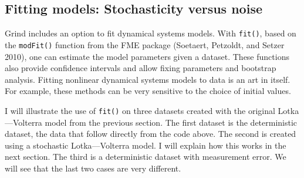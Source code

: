 \documentclass[
  a4paper,
  DIV=11,
  numbers=noendperiod,
  oneside]{scrreprt}
\begin{document}
\subsection{Fitting models: Stochasticity versus
noise}\label{sec-Fitting-models-stochasticity-versus-noise}

Grind includes an option to fit dynamical systems models. With
\texttt{fit()}, based on the \texttt{modFit()} function from the FME
package (Soetaert, Petzoldt, and Setzer 2010), one can estimate the
model parameters given a dataset. These functions also provide
confidence intervals and allow fixing parameters and bootstrap analysis.
Fitting nonlinear dynamical systems models to data is an art in itself.
For example, these methods can be very sensitive to the choice of
initial values.

I will illustrate the use of \texttt{fit()} on three datasets created
with the original Lotka---Volterra model from the previous section. The
first dataset is the deterministic dataset, the data that follow
directly from the code above. The second is created using a stochastic
Lotka---Volterra model. I will explain how this works in the next
section. The third is a deterministic dataset with measurement error. We
will see that the last two cases are very different.
\end{document}
